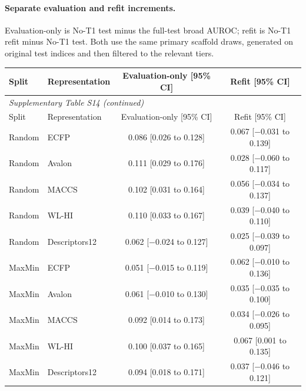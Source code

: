 \paragraph{Separate evaluation and refit increments.} Evaluation-only is No-T1 test minus the full-test broad AUROC; refit is No-T1 refit minus No-T1 test. Both use the same primary scaffold draws, generated on original test indices and then filtered to the relevant tiers.

\begingroup\footnotesize\setlength{\tabcolsep}{4pt}\begin{longtable}{llcc}

\toprule Split & Representation & Evaluation-only [95\% CI] & Refit [95\% CI] \\ \midrule\endfirsthead

\multicolumn{4}{l}{\textit{Supplementary Table S14 (continued)}} \\\toprule Split & Representation & Evaluation-only [95\% CI] & Refit [95\% CI] \\ \midrule\endhead

\bottomrule\endlastfoot

Random & ECFP & 0.086 [0.026 to 0.128] & 0.067 [$-$0.031 to 0.139] \\

Random & Avalon & 0.111 [0.029 to 0.176] & 0.028 [$-$0.060 to 0.117] \\

Random & MACCS & 0.102 [0.031 to 0.164] & 0.056 [$-$0.034 to 0.137] \\

Random & WL-HI & 0.110 [0.033 to 0.167] & 0.039 [$-$0.040 to 0.110] \\

Random & Descriptors12 & 0.062 [$-$0.024 to 0.127] & 0.025 [$-$0.039 to 0.097] \\

MaxMin & ECFP & 0.051 [$-$0.015 to 0.119] & 0.062 [$-$0.010 to 0.136] \\

MaxMin & Avalon & 0.061 [$-$0.010 to 0.130] & 0.035 [$-$0.035 to 0.100] \\

MaxMin & MACCS & 0.092 [0.014 to 0.173] & 0.034 [$-$0.026 to 0.095] \\

MaxMin & WL-HI & 0.100 [0.037 to 0.165] & 0.067 [0.001 to 0.135] \\

MaxMin & Descriptors12 & 0.094 [0.018 to 0.171] & 0.037 [$-$0.046 to 0.121] \\


\end{longtable}
